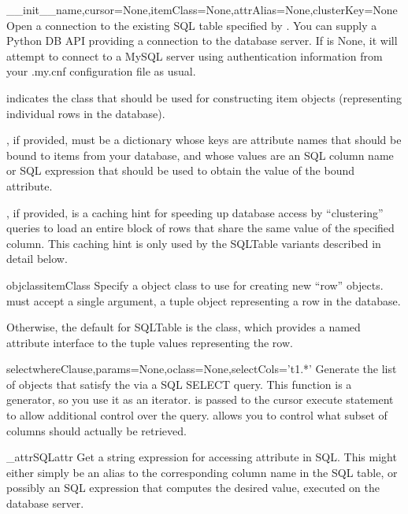 \documentclass{howto}
\begin{document}
\begin{funcdesc}{__init__}{name,cursor=None,itemClass=None,attrAlias=None,clusterKey=None}
  Open a connection to the existing SQL table specified by .
  You can supply a Python DB API  providing a connection
  to the database server.  If  is None, it will attempt
  to connect to a MySQL server using authentication information from your
  .my.cnf configuration file as usual.

   indicates 
  the class that should be used for constructing item objects (representing
  individual rows in the database).

  , if provided, must be a dictionary whose keys are
  attribute names that should be bound to items from your database,
  and whose values are an SQL column name or SQL expression that should
  be used to obtain the value of the bound attribute.

  , if provided, is a caching hint for speeding up
  database access by ``clustering'' queries to load an entire block
  of rows that share the same value of the specified  column.
  This caching hint is only used by the  SQLTable variants
  described in detail below.
\end{funcdesc}

\begin{funcdesc}{objclass}{itemClass}
  Specify a object class to use for creating new ``row'' objects.
   must accept a single argument, a tuple object representing
  a row in the database.  

  Otherwise, the default  for SQLTable is
  the  class, which provides a named attribute interface
  to the tuple values representing the row.
\end{funcdesc}

\begin{funcdesc}{select}{whereClause,params=None,oclass=None,selectCols='t1.*'}
  Generate the list of objects that satisfy the 
  via a SQL SELECT query.  This function is a generator, so you
  use it as an iterator.   is passed to the
  cursor execute statement to allow additional control over
  the query.   allows you to control what subset of
  columns should actually be retrieved.
\end{funcdesc}

\begin{funcdesc}{_attrSQL}{attr}
  Get a string expression for accessing attribute  in SQL.
  This might either simply be an alias to the corresponding column
  name in the SQL table, or possibly an SQL expression that computes
  the desired value, executed on the database server.
\end{funcdesc}
\end{document}

